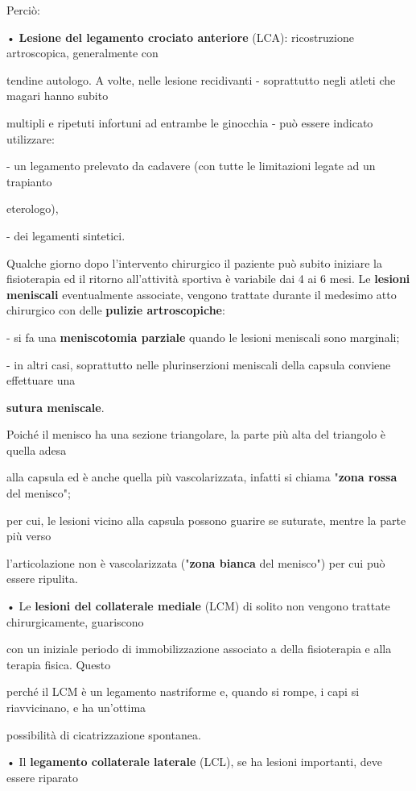 \documentclass[]{article}
\begin{document}
Perciò:

• \textbf{Lesione del legamento crociato anteriore} (LCA): ricostruzione
artroscopica, generalmente con

tendine autologo. A volte, nelle lesione recidivanti - soprattutto negli
atleti che magari hanno subito

multipli e ripetuti infortuni ad entrambe le ginocchia - può essere
indicato utilizzare:

- un legamento prelevato da cadavere (con tutte le limitazioni legate ad
un trapianto

eterologo),

- dei legamenti sintetici.

Qualche giorno dopo l'intervento chirurgico il paziente può subito
iniziare la fisioterapia ed il ritorno all'attività sportiva è variabile
dai 4 ai 6 mesi. Le \textbf{lesioni meniscali} eventualmente associate,
vengono trattate durante il medesimo atto chirurgico con delle
\textbf{pulizie artroscopiche}:

- si fa una \textbf{meniscotomia parziale} quando le lesioni meniscali
sono marginali;

- in altri casi, soprattutto nelle plurinserzioni meniscali della
capsula conviene effettuare una

\textbf{sutura meniscale}.

Poiché il menisco ha una sezione triangolare, la parte più alta del
triangolo è quella adesa

alla capsula ed è anche quella più vascolarizzata, infatti si chiama
"\textbf{zona rossa} del menisco";

per cui, le lesioni vicino alla capsula possono guarire se suturate,
mentre la parte più verso

l'articolazione non è vascolarizzata ("\textbf{zona bianca} del
menisco") per cui può essere ripulita.

• Le \textbf{lesioni del collaterale mediale} (LCM) di solito non
vengono trattate chirurgicamente, guariscono

con un iniziale periodo di immobilizzazione associato a della
fisioterapia e alla terapia fisica. Questo

perché il LCM è un legamento nastriforme e, quando si rompe, i capi si
riavvicinano, e ha un'ottima

possibilità di cicatrizzazione spontanea.

• Il \textbf{legamento collaterale laterale} (LCL), se ha lesioni
importanti, deve essere riparato
\end{document}

